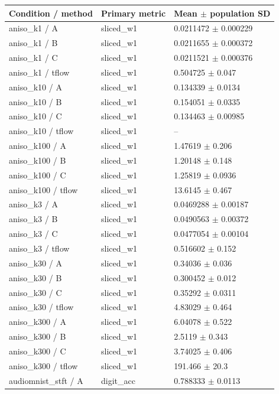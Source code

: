 \begin{tabular}{lll}
\toprule
Condition / method & Primary metric & Mean $\pm$ population SD \\
\midrule
aniso\_k1 / A & sliced\_w1 & 0.0211472 $\pm$ 0.000229 \\
aniso\_k1 / B & sliced\_w1 & 0.0211655 $\pm$ 0.000372 \\
aniso\_k1 / C & sliced\_w1 & 0.0211521 $\pm$ 0.000376 \\
aniso\_k1 / tflow & sliced\_w1 & 0.504725 $\pm$ 0.047 \\
aniso\_k10 / A & sliced\_w1 & 0.134339 $\pm$ 0.0134 \\
aniso\_k10 / B & sliced\_w1 & 0.154051 $\pm$ 0.0335 \\
aniso\_k10 / C & sliced\_w1 & 0.134463 $\pm$ 0.00985 \\
aniso\_k10 / tflow & sliced\_w1 & -- \\
aniso\_k100 / A & sliced\_w1 & 1.47619 $\pm$ 0.206 \\
aniso\_k100 / B & sliced\_w1 & 1.20148 $\pm$ 0.148 \\
aniso\_k100 / C & sliced\_w1 & 1.25819 $\pm$ 0.0936 \\
aniso\_k100 / tflow & sliced\_w1 & 13.6145 $\pm$ 0.467 \\
aniso\_k3 / A & sliced\_w1 & 0.0469288 $\pm$ 0.00187 \\
aniso\_k3 / B & sliced\_w1 & 0.0490563 $\pm$ 0.00372 \\
aniso\_k3 / C & sliced\_w1 & 0.0477054 $\pm$ 0.00104 \\
aniso\_k3 / tflow & sliced\_w1 & 0.516602 $\pm$ 0.152 \\
aniso\_k30 / A & sliced\_w1 & 0.34036 $\pm$ 0.036 \\
aniso\_k30 / B & sliced\_w1 & 0.300452 $\pm$ 0.012 \\
aniso\_k30 / C & sliced\_w1 & 0.35292 $\pm$ 0.0311 \\
aniso\_k30 / tflow & sliced\_w1 & 4.83029 $\pm$ 0.464 \\
aniso\_k300 / A & sliced\_w1 & 6.04078 $\pm$ 0.522 \\
aniso\_k300 / B & sliced\_w1 & 2.5119 $\pm$ 0.343 \\
aniso\_k300 / C & sliced\_w1 & 3.74025 $\pm$ 0.406 \\
aniso\_k300 / tflow & sliced\_w1 & 191.466 $\pm$ 20.3 \\
audiomnist\_stft / A & digit\_acc & 0.788333 $\pm$ 0.0113 \\

\end{tabular}
